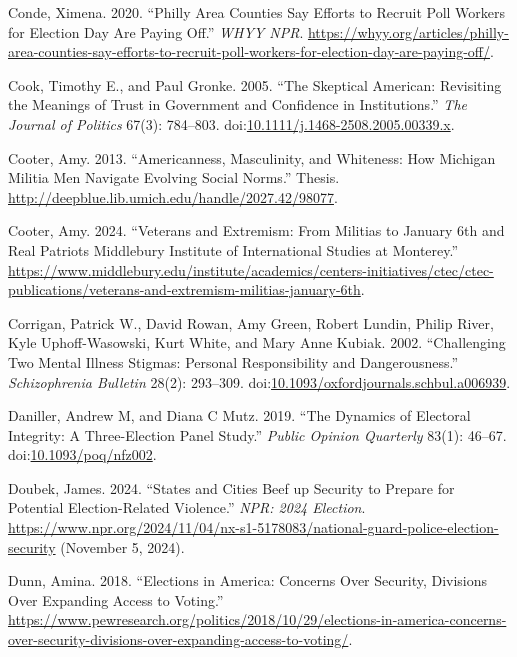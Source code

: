 \documentclass[
  12pt,
  letterpaper,
]{article}
\newlength{\cslhangindent}
\newenvironment{CSLReferences}[2] %
 {\begin{list}{}{%
  \setlength{\itemindent}{0pt}
  \setlength{\leftmargin}{0pt}
  \setlength{\parsep}{0pt}
  \ifodd #1
   \setlength{\leftmargin}{\cslhangindent}
   \setlength{\itemindent}{-1\cslhangindent}
  \fi
  \setlength{\itemsep}{#2\baselineskip}}}
 {\end{list}}
\begin{document}
\begin{CSLReferences}{1}{1}
Conde, Ximena. 2020. {``Philly Area Counties Say Efforts to Recruit Poll
Workers for {Election Day} Are Paying Off.''} \emph{WHYY NPR}.
\url{https://whyy.org/articles/philly-area-counties-say-efforts-to-recruit-poll-workers-for-election-day-are-paying-off/}.

Cook, Timothy E., and Paul Gronke. 2005. {``The {Skeptical American}:
{Revisiting} the {Meanings} of {Trust} in {Government} and {Confidence}
in {Institutions}.''} \emph{The Journal of Politics} 67(3): 784--803.
doi:\href{https://doi.org/10.1111/j.1468-2508.2005.00339.x}{10.1111/j.1468-2508.2005.00339.x}.

Cooter, Amy. 2013. {``Americanness, {Masculinity}, and {Whiteness}: {How
Michigan Militia Men Navigate Evolving Social Norms}.''} Thesis.
\url{http://deepblue.lib.umich.edu/handle/2027.42/98077}.

Cooter, Amy. 2024. {``Veterans and {Extremism}: {From Militias} to
{January} 6th and {Real Patriots} \textbar{} {Middlebury Institute} of
{International Studies} at {Monterey}.''}
\url{https://www.middlebury.edu/institute/academics/centers-initiatives/ctec/ctec-publications/veterans-and-extremism-militias-january-6th}.

Corrigan, Patrick W., David Rowan, Amy Green, Robert Lundin, Philip
River, Kyle Uphoff-Wasowski, Kurt White, and Mary Anne Kubiak. 2002.
{``Challenging {Two Mental Illness Stigmas}: {Personal Responsibility}
and {Dangerousness}.''} \emph{Schizophrenia Bulletin} 28(2): 293--309.
doi:\href{https://doi.org/10.1093/oxfordjournals.schbul.a006939}{10.1093/oxfordjournals.schbul.a006939}.

Daniller, Andrew M, and Diana C Mutz. 2019. {``The {Dynamics} of
{Electoral Integrity}: {A Three-Election Panel Study}.''} \emph{Public
Opinion Quarterly} 83(1): 46--67.
doi:\href{https://doi.org/10.1093/poq/nfz002}{10.1093/poq/nfz002}.

Doubek, James. 2024. {``States and Cities Beef up Security to Prepare
for Potential Election-Related Violence.''} \emph{NPR: 2024 Election}.
\url{https://www.npr.org/2024/11/04/nx-s1-5178083/national-guard-police-election-security}
(November 5, 2024).

Dunn, Amina. 2018. {``Elections in {America}: {Concerns Over Security},
{Divisions Over Expanding Access} to {Voting}.''}
\url{https://www.pewresearch.org/politics/2018/10/29/elections-in-america-concerns-over-security-divisions-over-expanding-access-to-voting/}.


\end{CSLReferences}
\end{document}
